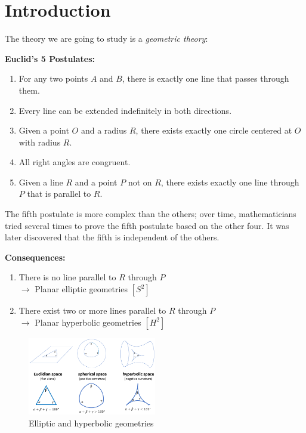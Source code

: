 
\chapter{Introduction}

The theory we are going to study is a \textit{geometric theory}:

\textbf{Euclid's 5 Postulates:}
\begin{enumerate}
    \item For any two points $A$ and $B$, there is exactly one line that passes through them.
    \item Every line can be extended indefinitely in both directions.
    \item Given a point $O$ and a radius $R$, there exists exactly one circle centered at $O$ with radius $R$.
    \item All right angles are congruent.
    \item Given a line $R$ and a point $P$ not on $R$, there exists exactly one line through $P$ that is parallel to $R$.
\end{enumerate}

The fifth postulate is more complex than the others; over time, mathematicians tried several times to prove the fifth postulate based on the other four. It was later discovered that the fifth is independent of the others.

\textbf{Consequences:}
\begin{enumerate}
    \item There is no line parallel to $R$ through $P$ \\
    \quad $\rightarrow$ Planar elliptic geometries $[S^2]$
    \item There exist two or more lines parallel to $R$ through $P$ \\
    \quad $\rightarrow$ Planar hyperbolic geometries $[H^2]$
\end{enumerate}

\begin{figure}[H]
    \centering
    \includegraphics[width=0.5\textwidth]{assets/geometries.png}
    \caption{Elliptic and hyperbolic geometries}
\end{figure}

